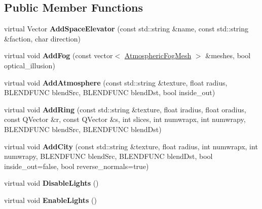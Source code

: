\subsection*{Public Member Functions}
\begin{DoxyCompactItemize}
\item 
virtual Vector {\bfseries Add\+Space\+Elevator} (const std\+::string \&name, const std\+::string \&faction, char direction)\hypertarget{classPlanet_a3eadac928eddf6a6879091836195fdda}{}\label{classPlanet_a3eadac928eddf6a6879091836195fdda}

\item 
virtual void {\bfseries Add\+Fog} (const vector$<$ \hyperlink{structAtmosphericFogMesh}{Atmospheric\+Fog\+Mesh} $>$ \&meshes, bool optical\+\_\+illusion)\hypertarget{classPlanet_abeab827a319dbafc225579dcb8db3196}{}\label{classPlanet_abeab827a319dbafc225579dcb8db3196}

\item 
virtual void {\bfseries Add\+Atmosphere} (const std\+::string \&texture, float radius, B\+L\+E\+N\+D\+F\+U\+NC blend\+Src, B\+L\+E\+N\+D\+F\+U\+NC blend\+Dst, bool inside\+\_\+out)\hypertarget{classPlanet_abafc85439b242e113fe02ef28626b252}{}\label{classPlanet_abafc85439b242e113fe02ef28626b252}

\item 
virtual void {\bfseries Add\+Ring} (const std\+::string \&texture, float iradius, float oradius, const Q\+Vector \&r, const Q\+Vector \&s, int slices, int numwrapx, int numwrapy, B\+L\+E\+N\+D\+F\+U\+NC blend\+Src, B\+L\+E\+N\+D\+F\+U\+NC blend\+Dst)\hypertarget{classPlanet_ab68dc5aa268a1953ad0f841d5b200ec9}{}\label{classPlanet_ab68dc5aa268a1953ad0f841d5b200ec9}

\item 
virtual void {\bfseries Add\+City} (const std\+::string \&texture, float radius, int numwrapx, int numwrapy, B\+L\+E\+N\+D\+F\+U\+NC blend\+Src, B\+L\+E\+N\+D\+F\+U\+NC blend\+Dst, bool inside\+\_\+out=false, bool reverse\+\_\+normals=true)\hypertarget{classPlanet_ae9506654c5d2271bb86cc23cd00fe414}{}\label{classPlanet_ae9506654c5d2271bb86cc23cd00fe414}

\item 
virtual void {\bfseries Disable\+Lights} ()\hypertarget{classPlanet_a421a3a625a882f589e6634a5ff08b50f}{}\label{classPlanet_a421a3a625a882f589e6634a5ff08b50f}

\item 
virtual void {\bfseries Enable\+Lights} ()\hypertarget{classPlanet_a760b573d38d965a40515c8eff6955655}{}\label{classPlanet_a760b573d38d965a40515c8eff6955655}


\end{DoxyCompactItemize}
